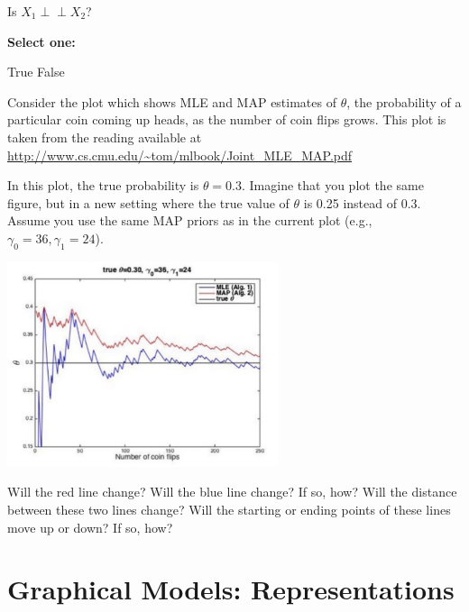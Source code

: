 \documentclass[11pt,addpoints,answers]{exam}
\newcommand{\independent}{\perp\!\!\!\perp  }
\begin{document}
\begin{questions}
\begin{questions}
\question[3] Is $X_1 \independent X_2 $?

\textbf{Select one:}
    \begin{checkboxes}
        \choice True
        \choice False
\end{checkboxes}



\clearpage

\question[4] Consider the plot which shows MLE and MAP estimates of $\theta$, the probability of a particular coin coming up heads, as the number of coin flips grows. This plot is taken from the reading available at \url{http://www.cs.cmu.edu/~tom/mlbook/Joint_MLE_MAP.pdf}

In this plot, the true probability is $\theta = 0.3$.  Imagine that you plot the same figure, but in a new setting where the true value of $\theta$ is 0.25 instead of 0.3.  Assume you use the same MAP priors as in the current plot (e.g., $\gamma_0=36, \gamma_1=24$).\\
\begin{center}
\includegraphics[width=300px]{images/mle-map-graph.png}
\end{center}
Will the red line change?  Will the blue line change? If so, how? Will the distance between these two lines change? Will the starting or ending points of these lines move up or down?  If so, how? \\

 \begin{your_solution}[title=Your answer:,height=5cm,width=15cm]
\end{your_solution}


\end{questions}

\newpage
\section{ Graphical Models: Representations}



\end{questions}
\end{document}
